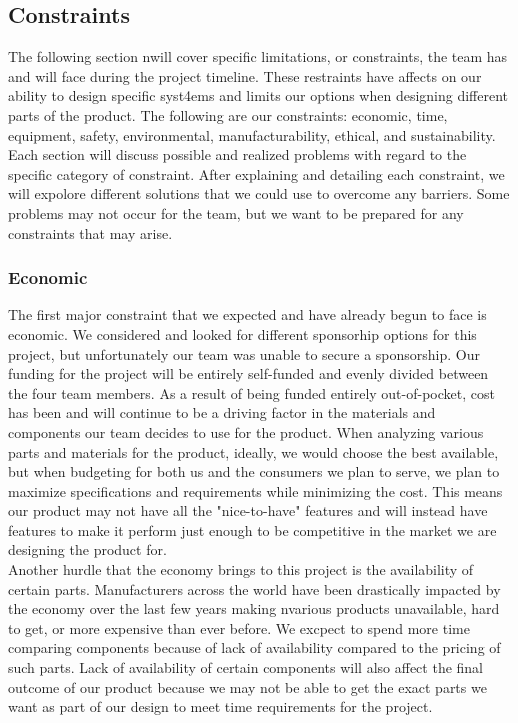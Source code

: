 \subsection{Constraints}
The following section nwill cover specific limitations, or constraints, the team has and will face during the project timeline. These restraints have affects on our ability to design specific syst4ems and limits our options when designing different parts of the product. The following are our constraints: economic, time, equipment, safety, environmental, manufacturability, ethical, and sustainability. Each section will discuss possible and realized problems with regard to the specific category of constraint. After explaining and detailing each constraint, we will expolore different solutions that we could use to overcome any barriers. Some problems may not occur for the team, but we want to be prepared for any constraints that may arise. 
\subsubsection{Economic}
The first major constraint that we expected and have already begun to face is economic. We considered and looked for different sponsorhip options for this project, but unfortunately our team was unable to secure a sponsorship. Our funding for the project will be entirely self-funded and evenly divided between the four team members. As a result of being funded entirely out-of-pocket, cost has been and will continue to be a driving factor in the materials and components our team decides to use for the product. When analyzing various parts and materials for the product, ideally, we would choose the best available, but when budgeting for both us and the consumers we plan to serve, we plan to maximize specifications and requirements while minimizing the cost. This means our product may not have all the "nice-to-have" features and will instead have features to make it perform just enough to be competitive in the market we are designing the product for.  \\

Another hurdle that the economy brings to this project is the availability of certain parts. Manufacturers across the world have been drastically impacted by the economy over the last few years making nvarious products unavailable, hard to get, or more expensive than ever before. We excpect to spend more time comparing components because of lack of availability compared to the pricing of such parts. Lack of availability of certain components will also affect the final outcome of our product because we may not be able to get the exact parts we want as part of our design to meet time requirements for the project.\\

